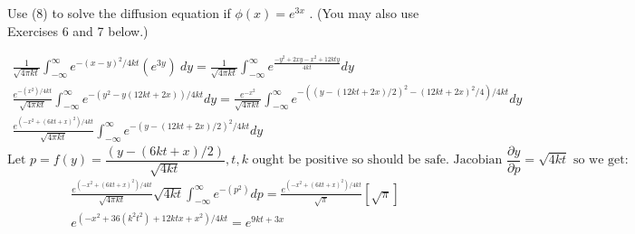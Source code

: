 \newpage
Use (8) to solve the diffusion equation if $\phi(x) = e^{3x}$ . (You may also use
Exercises 6 and 7 below.)

\begin{gather*}
	\frac{ 1 }{\sqrt{ 4 \pi k t } }\int_{-\infty }^{\infty }e^{-(x-y)^2/4kt}(e^{3y})\ dy = \frac{ 1 }{\sqrt{ 4 \pi k t }}\int_{-\infty }^{\infty } e^{\frac{-y^2+2xy-x^2+12kty  }{4kt }}dy\\
	\frac{ e^{-(x^2)/4kt} }{\sqrt{ 4\pi kt }}\int_{-\infty }^{\infty }e^{-(y^2-y(12kt+2x))/4kt}dy=\frac{ e^{-x^2} }{\sqrt{ 4\pi kt }}\int_{-\infty }^{\infty }e^{-((y-(12kt+2x)/2)^2-(12kt+2x)^2/4)/4kt}dy\\
\frac{ e^{(-x^2+(6kt+x)^2)/4kt}}{\sqrt{ 4\pi kt }}\int_{-\infty }^{\infty }e^{-(y-(12kt+2x)/2)^2/4kt}dy\end{gather*}
$$ \text{Let } p=f(y)=\frac{(y-(6kt+x)/2) }{\sqrt{ 4kt}}, t,k\text{ ought be positive so should be safe. Jacobian }\frac{\partial y}{\partial p }=\sqrt{ 4kt } \text{ so we get}:$$
\begin{gather*}
\frac{ e^{(-x^2+(6kt+x)^2)/4kt}}{\sqrt{ 4\pi kt }}\sqrt{ 4kt }\int_{-\infty }^{\infty }e^{-(p^2)}dp=\frac{ e^{(-x^2+(6kt+x)^2)/4kt}}{\sqrt{ \pi  }}\left[  \sqrt{ \pi } \right]\\
e^{(-x^2+36(k^2t^2)+12ktx+x^2)/4kt}=e^{9kt+3x}
\end{gather*}
